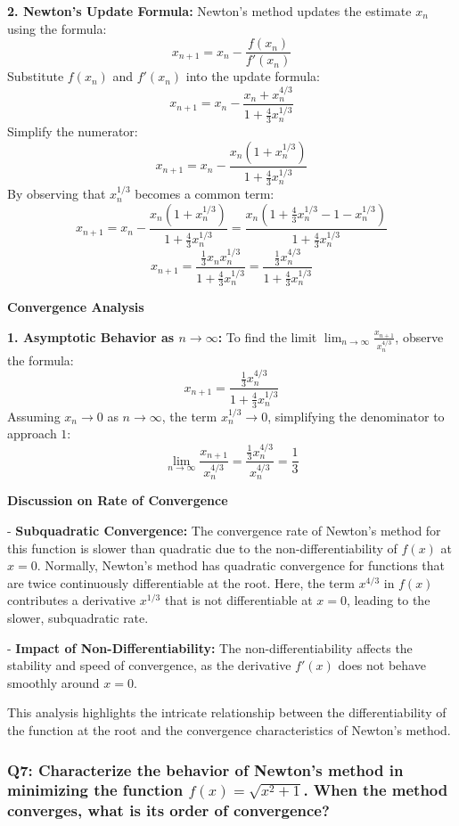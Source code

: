 \documentclass[8pt]{article}
\begin{document}
\textbf{2. Newton's Update Formula:}
   Newton's method updates the estimate \(x_n\) using the formula:
   \[
   x_{n+1} = x_n - \frac{f(x_n)}{f'(x_n)}
   \]
   Substitute \(f(x_n)\) and \(f'(x_n)\) into the update formula:
   \[
   x_{n+1} = x_n - \frac{x_n + x_n^{4/3}}{1 + \frac{4}{3} x_n^{1/3}}
   \]
   Simplify the numerator:
   \[
   x_{n+1} = x_n - \frac{x_n(1 + x_n^{1/3})}{1 + \frac{4}{3} x_n^{1/3}}
   \]
   By observing that \(x_n^{1/3}\) becomes a common term:
   \[
   x_{n+1} = x_n - \frac{x_n(1 + x_n^{1/3})}{1 + \frac{4}{3} x_n^{1/3}} = \frac{x_n \left(1 + \frac{4}{3}x_n^{1/3} - 1 - x_n^{1/3}\right)}{1 + \frac{4}{3} x_n^{1/3}}
   \]
   \[
   x_{n+1} = \frac{\frac{1}{3} x_n x_n^{1/3}}{1 + \frac{4}{3} x_n^{1/3}} = \frac{\frac{1}{3} x_n^{4/3}}{1 + \frac{4}{3} x_n^{1/3}}
   \]

\textbf{Convergence Analysis}

\textbf{1. Asymptotic Behavior as \(n \to \infty\):}
   To find the limit \(\lim_{n \to \infty} \frac{x_{n+1}}{x_n^{4/3}}\), observe the formula:
   \[
   x_{n+1} = \frac{\frac{1}{3} x_n^{4/3}}{1 + \frac{4}{3} x_n^{1/3}}
   \]
   Assuming \(x_n \to 0\) as \(n \to \infty\), the term \(x_n^{1/3} \to 0\), simplifying the denominator to approach \(1\):
   \[
   \lim_{n \to \infty} \frac{x_{n+1}}{x_n^{4/3}} = \frac{\frac{1}{3} x_n^{4/3}}{x_n^{4/3}} = \frac{1}{3}
   \]

\textbf{Discussion on Rate of Convergence}

- \textbf{Subquadratic Convergence:} The convergence rate of Newton's method for this function is slower than quadratic due to the non-differentiability of \(f(x)\) at \(x = 0\). Normally, Newton's method has quadratic convergence for functions that are twice continuously differentiable at the root. Here, the term \(x^{4/3}\) in \(f(x)\) contributes a derivative \(x^{1/3}\) that is not differentiable at \(x = 0\), leading to the slower, subquadratic rate.

- \textbf{Impact of Non-Differentiability:} The non-differentiability affects the stability and speed of convergence, as the derivative \(f'(x)\) does not behave smoothly around \(x = 0\).

This analysis highlights the intricate relationship between the differentiability of the function at the root and the convergence characteristics of Newton's method.

\subsubsection*{Q7: Characterize the behavior of Newton’s method in minimizing the function \(f(x) = \sqrt{x^2 + 1}\). When the method converges, what is its order of convergence?}
\end{document}
